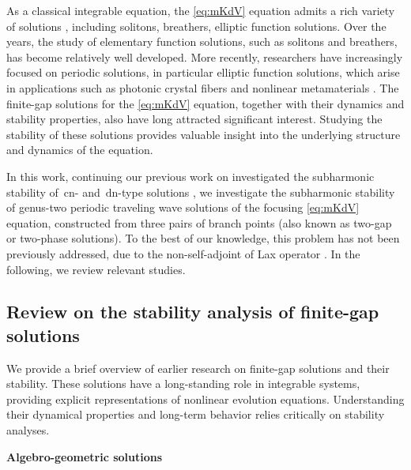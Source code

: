 \documentclass[11pt,reqno]{amsart}
\newcommand{\cn}{\mathrm{cn}}
\newcommand{\dn}{\mathrm{dn}}
\numberwithin{equation}{section}
\begin{document}
As a classical integrable equation, the \ref{eq:mKdV} equation admits a rich variety of solutions \cite{AblowitzKNS-1974-inverse,BilmanM-19,GardnerGKM-67,FritzH-2003-Algebro-Geometric,ZakharovS-72}, including solitons, breathers, elliptic function solutions.
Over the years, the study of elementary function solutions, such as solitons and breathers, has become relatively well developed.
More recently, researchers have increasingly focused on periodic solutions, in particular elliptic function solutions, which arise in applications such as photonic crystal fibers and nonlinear metamaterials \cite{LapineSK-2014,Russell-2003}.
The finite-gap solutions for the \ref{eq:mKdV} equation, together with their dynamics and stability properties, also have long attracted significant interest. 
Studying the stability of these solutions provides valuable insight into the underlying structure and dynamics of the equation.


In this work, continuing our previous work on investigated the subharmonic stability of $\cn$- and $\dn$-type solutions \cite{LingS-23-mKdV-stability}, we investigate the subharmonic stability of genus-two periodic traveling wave solutions  of the focusing \ref{eq:mKdV} equation, constructed from three pairs of branch points (also known as two-gap or two-phase solutions).
To the best of our knowledge, this problem has not been previously addressed, due to the non-self-adjoint of Lax operator \cite{Deconinck-10}. 
In the following, we review relevant studies.

\subsection{Review on the stability analysis of finite-gap solutions}


 

We provide a brief overview of earlier research on finite-gap solutions and their stability. 
These solutions have a long-standing role in integrable systems, providing explicit representations of nonlinear evolution equations. 
Understanding their dynamical properties and long-term behavior relies critically on stability analyses.

\vspace{0.5cm}
\noindent 
\textbf{\Large Algebro-geometric solutions}
\vspace{0.2cm}
\end{document}
